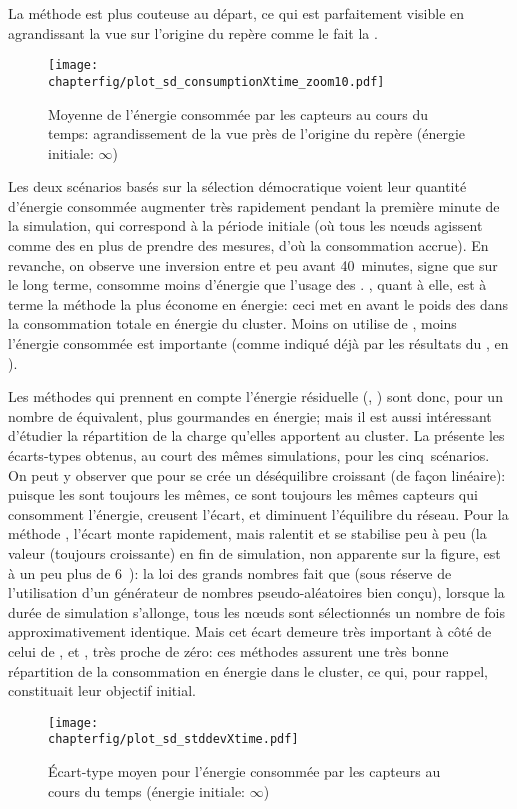 La méthode \iddemx est plus couteuse au départ, ce qui est parfaitement visible en agrandissant la vue sur l'origine du repère comme le fait la .
\begin{figure}[!ht]
    \centering
    \texttt{[image: \\chapterfig/plot\_sd\_consumptionXtime\_zoom10.pdf]}
    \caption[Moyenne de l'énergie consommée par les capteurs au cours du temps: agrandissement de la vue près de l'origine du repère]{Moyenne de l'énergie consommée par les capteurs au cours du temps: agrandissement de la vue près de l'origine du repère (énergie initiale: $\infty$)}\label{sd:fig:cons-inf-zoom}
\end{figure}
Les deux scénarios basés sur la sélection démocratique voient leur quantité d'énergie consommée augmenter très rapidement pendant la première minute de la simulation, qui correspond à la période initiale (où tous les nœuds agissent comme des \cns en plus de prendre des mesures, d'où la consommation accrue).
En revanche, on observe une inversion entre \ideres et \iddemx peu avant 40~minutes, signe que sur le long terme, \iddemx consomme moins d'énergie que l'usage des \vns.
\iddems, quant à elle, est à terme la méthode la plus économe en énergie: ceci met en avant le poids des \cns dans la consommation totale en énergie du cluster.
Moins on utilise de \cns, moins l'énergie consommée est importante (comme indiqué déjà par les résultats du , en ).

Les méthodes qui prennent en compte l'énergie résiduelle (\ideres, \iddemx) sont donc, pour un nombre de \cns équivalent, plus gourmandes en énergie; mais il est aussi intéressant d'étudier la répartition de la charge qu'elles apportent au cluster.
La  présente les écarts-types obtenus, au court des mêmes simulations, pour les cinq~scénarios.
On peut y observer que pour \idstat se crée un déséquilibre croissant (de façon linéaire): puisque les \cns sont toujours les mêmes, ce sont toujours les mêmes capteurs qui consomment l'énergie, creusent l'écart, et diminuent l'équilibre du réseau.
Pour la méthode \idrand, l'écart monte rapidement, mais ralentit et se stabilise peu à peu (la valeur (toujours croissante) en fin de simulation, non apparente sur la figure, est à un peu plus de 6~\joule): la loi des grands nombres fait que (sous réserve de l'utilisation d'un générateur de nombres pseudo-aléatoires bien conçu), lorsque la durée de simulation s'allonge, tous les nœuds sont sélectionnés un nombre de fois approximativement identique.
Mais cet écart demeure très important à côté de celui de \ideres, \iddemx et \iddems, très proche de zéro: ces méthodes assurent une très bonne répartition de la consommation en énergie dans le cluster, ce qui, pour rappel, constituait leur objectif initial.
\begin{figure}[!ht]
    \centering
    \texttt{[image: \\chapterfig/plot\_sd\_stddevXtime.pdf]}
    \caption[Écart-type moyen pour l'énergie consommée par les capteurs au cours du temps]{Écart-type moyen pour l'énergie consommée par les capteurs au cours du temps (énergie initiale: $\infty$)}\label{sd:fig:stddev-inf}
\end{figure}

